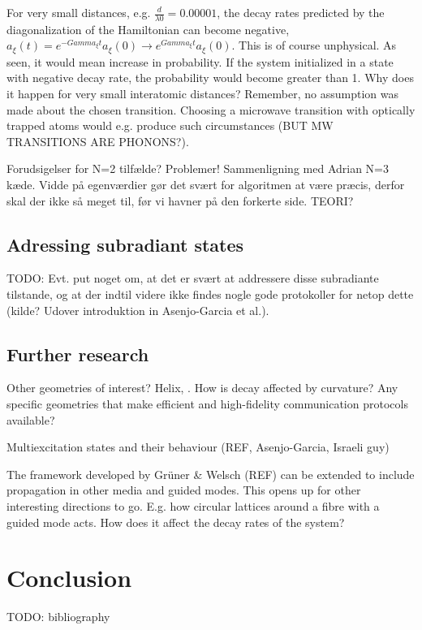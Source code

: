 \documentclass{article}
\begin{document}
For very small distances, e.g. $\frac{d}{\lambda0} = 0.00001$, the decay rates predicted by the diagonalization of the Hamiltonian can become negative, $a_\xi(t)=e^{-Gamma_\xi t} a_\xi (0) \rightarrow e^{Gamma_\xi t} a_\xi (0)$. This is of course unphysical. As seen, it would mean increase in probability. If the system initialized in a state with negative decay rate, the probability would become greater than 1. Why does it happen for very small interatomic distances? Remember, no assumption was made about the chosen transition. Choosing a microwave transition with optically trapped atoms would e.g. produce such circumstances (BUT MW TRANSITIONS ARE PHONONS?). 

Forudsigelser for N=2 tilfælde? Problemer! Sammenligning med Adrian N=3 kæde. Vidde på egenværdier gør det svært for algoritmen at være præcis, derfor skal der ikke så meget til, før vi havner på den forkerte side. TEORI?

\subsection{Adressing subradiant states}

TODO: Evt. put noget om, at det er svært at addressere disse subradiante tilstande, og at der indtil videre ikke findes nogle gode protokoller for netop dette (kilde? Udover introduktion in Asenjo-Garcia et al.). 

\subsection{Further research}\label{sec:further}

Other geometries of interest? Helix, . How is decay affected by curvature?
Any specific geometries that make efficient and high-fidelity communication protocols available?

Multiexcitation states and their behaviour (REF, Asenjo-Garcia, Israeli guy)

The framework developed by Grüner \& Welsch (REF) can be extended to include propagation in other media and guided modes. This opens up for other interesting directions to go. E.g. how circular lattices around a fibre with a guided mode acts. How does it affect the decay rates of the system? 

\section{Conclusion}

\newpage
TODO: bibliography
\end{document}
